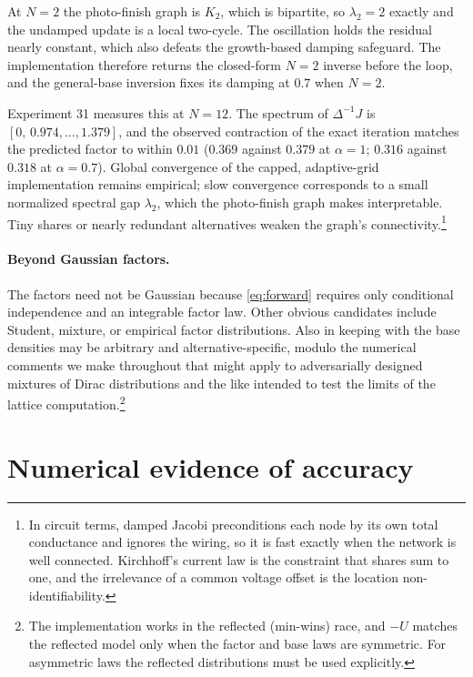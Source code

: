 \documentclass[12pt]{article}
\theoremstyle{remark}
\begin{document}
At $N = 2$ the photo-finish graph is $K_2$, which is bipartite, so
$\lambda_2 = 2$ exactly and the undamped update is a local two-cycle.
The oscillation holds the residual nearly constant, which also defeats
the growth-based damping safeguard. The implementation therefore
returns the closed-form $N = 2$ inverse before the loop, and the
general-base inversion fixes its damping at $0.7$ when $N = 2$.

Experiment 31 measures this at $N = 12$. The spectrum of $\Delta^{-1}J$ is
$[0,\, 0.974, \dots, 1.379]$, and the observed contraction of the
exact iteration matches the predicted factor to within $0.01$ ($0.369$
against $0.379$ at $\alpha = 1$; $0.316$ against $0.318$ at $\alpha =
0.7$). Global convergence of the capped, adaptive-grid implementation
remains empirical; slow convergence corresponds to a small normalized
spectral gap $\lambda_2$, which the photo-finish graph makes
interpretable. Tiny shares or nearly redundant alternatives weaken the
graph's connectivity.\footnote{In circuit terms, damped Jacobi
preconditions each node by its own total conductance and ignores the
wiring, so it is fast exactly when the network is well connected.
Kirchhoff's current law is the constraint that shares sum to one, and
the irrelevance of a common voltage offset is the location
non-identifiability.}

\paragraph{Beyond Gaussian factors.} The factors need not be Gaussian because \eqref{eq:forward} requires only
conditional independence and an integrable factor law. Other obvious candidates include Student, mixture,
or empirical factor distributions. Also in keeping with \citet{cotton2021} the base densities may be arbitrary and alternative-specific, modulo
the numerical comments we make throughout that might apply to adversarially designed mixtures of Dirac distributions and the like intended to test the 
limits of the lattice computation.\footnote{The implementation works in the reflected (min-wins) race,
and $-U$ matches the reflected model only when the factor and base laws
are symmetric. For asymmetric laws the reflected distributions must be
used explicitly.}

\section{Numerical evidence of accuracy}\label{sec:benchmark}
\end{document}
